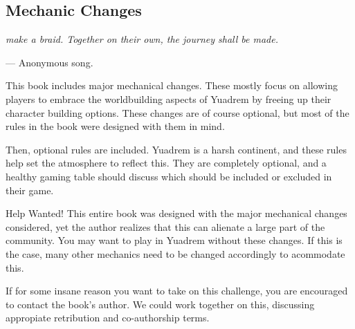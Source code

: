 \begin{linenumbers}

\chapter{Mechanic Changes}
\textit{make a braid.
Together on their own, the journey shall be made.}

\hspace*{\fill} --- Anonymous song.

This book includes major mechanical changes.
These mostly focus on allowing players to embrace the worldbuilding aspects of Yuadrem by freeing up their character building options.
These changes are of course optional, but most of the rules in the book were designed with them in mind.

Then, optional rules are included.
Yuadrem is a harsh continent, and these rules help set the atmosphere to reflect this.
They are completely optional, and a healthy gaming table should discuss which should be included or excluded in their game.

\begin{DndComment}[float=h]{Help Wanted!}
    This entire book was designed with the major mechanical changes considered, yet the author realizes that this can alienate a large part of the community.
    You may want to play in Yuadrem without these changes.
    If this is the case, many other mechanics need to be changed accordingly to acommodate this.

    If for some insane reason you want to take on this challenge, you are encouraged to contact the book's author.
    We could work together on this, discussing appropiate retribution and co-authorship terms.
\end{DndComment}






\end{linenumbers}
